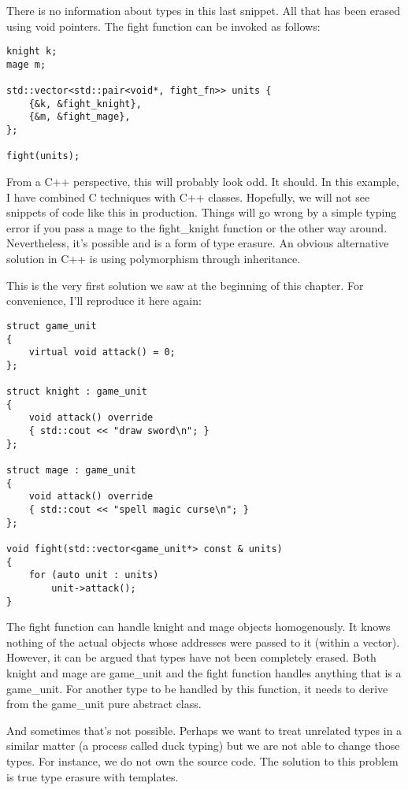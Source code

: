 There is no information about types in this last snippet. All that has been erased using void pointers. The fight function can be invoked as follows:

\begin{lstlisting}[style=styleCXX]
knight k;
mage m;

std::vector<std::pair<void*, fight_fn>> units {
	{&k, &fight_knight},
	{&m, &fight_mage},
};

fight(units);
\end{lstlisting}

From a C++ perspective, this will probably look odd. It should. In this example, I have combined C techniques with C++ classes. Hopefully, we will not see snippets of code like this in production. Things will go wrong by a simple typing error if you pass a mage to the fight\_knight function or the other way around. Nevertheless, it’s possible and is a form of type erasure. An obvious alternative solution in C++ is using polymorphism through inheritance.

This is the very first solution we saw at the beginning of this chapter. For convenience, I’ll reproduce it here again:

\begin{lstlisting}[style=styleCXX]
struct game_unit
{
	virtual void attack() = 0;
};

struct knight : game_unit
{
	void attack() override
	{ std::cout << "draw sword\n"; }
};

struct mage : game_unit
{
	void attack() override
	{ std::cout << "spell magic curse\n"; }
};

void fight(std::vector<game_unit*> const & units)
{
	for (auto unit : units)
		unit->attack();
}
\end{lstlisting}

The fight function can handle knight and mage objects homogenously. It knows nothing of the actual objects whose addresses were passed to it (within a vector). However, it can be argued that types have not been completely erased. Both knight and mage are game\_unit and the fight function handles anything that is a game\_unit. For another type to be handled by this function, it needs to derive from the game\_unit pure abstract class.

And sometimes that’s not possible. Perhaps we want to treat unrelated types in a similar matter (a process called duck typing) but we are not able to change those types. For instance, we do not own the source code. The solution to this problem is true type erasure with templates.

